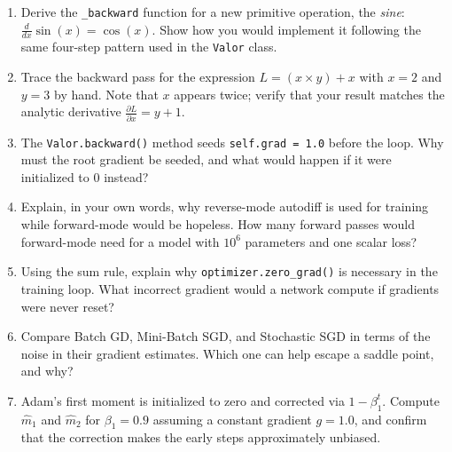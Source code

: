 \documentclass{tufte-handout}
\begin{document}
\begin{enumerate}[leftmargin=*, itemsep=4pt]
    \item Derive the \texttt{\_backward} function for a new primitive operation, the \emph{sine}: $\frac{d}{dx}\sin(x) = \cos(x)$. Show how you would implement it following the same four-step pattern used in the \texttt{Valor} class.
    \item Trace the backward pass for the expression $L = (x \times y) + x$ with $x = 2$ and $y = 3$ by hand. Note that $x$ appears twice; verify that your result matches the analytic derivative $\frac{\partial L}{\partial x} = y + 1$.
    \item The \texttt{Valor.backward()} method seeds \texttt{self.grad = 1.0} before the loop. Why must the root gradient be seeded, and what would happen if it were initialized to $0$ instead?
    \item Explain, in your own words, why reverse-mode autodiff is used for training while forward-mode would be hopeless. How many forward passes would forward-mode need for a model with $10^6$ parameters and one scalar loss?
    \item Using the sum rule, explain why \texttt{optimizer.zero\_grad()} is necessary in the training loop. What incorrect gradient would a network compute if gradients were never reset?
    \item Compare Batch GD, Mini-Batch SGD, and Stochastic SGD in terms of the noise in their gradient estimates. Which one can help escape a saddle point, and why?
    \item Adam's first moment is initialized to zero and corrected via $1 - \beta_1^t$. Compute $\hat{m}_1$ and $\hat{m}_2$ for $\beta_1 = 0.9$ assuming a constant gradient $g = 1.0$, and confirm that the correction makes the early steps approximately unbiased.
\end{enumerate}
\end{document}
